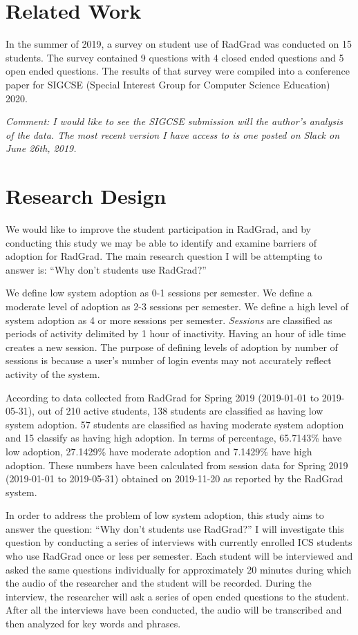 \documentclass[english]{proposalnsf}
\begin{document}
\section{Related Work}
\label{related-work}

In the summer of 2019, a survey on student use of RadGrad was conducted on 15 students. The survey contained 9 questions with 4 closed ended questions and 5 open ended questions.  
The results of that survey were compiled into a conference paper for SIGCSE (Special Interest Group for Computer Science Education) 2020.

{\em Comment: I would like to see the SIGCSE submission will the author's analysis of the data. The most recent version I have access to is one posted on Slack on June 26th, 2019.}
\section{Research Design}
\label{research-design}

We would like to improve the student participation in RadGrad, and by conducting this study we may be able to identify and examine barriers of adoption for RadGrad. The main research question I will be attempting to answer is: ``Why don't students use RadGrad?''

We define low system adoption as 0-1 sessions per semester. We define a moderate level of adoption as 2-3 sessions per semester.  We define a high level of system adoption as 4 or more sessions per semester. 
{\em Sessions} are classified as periods of activity delimited by 1 hour of inactivity. Having an hour of idle time creates a new session. The purpose of defining levels of adoption by number of sessions is because a user's number of login events may not accurately reflect activity of the system. 

According to data collected from RadGrad for Spring 2019 (2019-01-01 to 2019-05-31), out of 210 active students, 138 students are classified as having low system adoption. 57 students are classified as having moderate system adoption and 15 classify as having high adoption. In terms of percentage, 65.7143{\%} have low adoption, 27.1429{\%} have moderate adoption and 7.1429{\%} have high adoption. These numbers have been calculated from session data for Spring 2019 (2019-01-01 to 2019-05-31) obtained on 2019-11-20 as reported by the RadGrad system. 

In order to address the problem of low system adoption, this study aims to answer the question: ``Why don't students use RadGrad?'' I will investigate this question by conducting a series of interviews with currently enrolled ICS students who use RadGrad once or less per semester. Each student will be interviewed and asked the same questions individually for approximately 20 minutes during which the audio of the researcher and the student will be recorded. During the interview, the researcher will ask a series of open ended questions to the student. After all the interviews have been conducted, the audio will be transcribed and then analyzed for key words and phrases.
\end{document}
